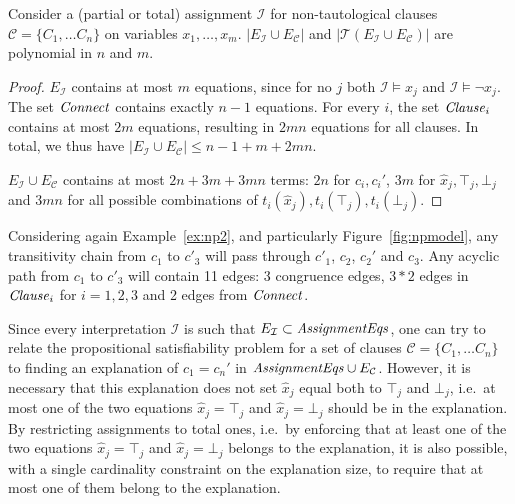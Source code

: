 \documentclass[smallextended]{svjour3}
\newcommand{\Assignment}{{\it AssignmentEqs}}
\newcommand{\Clause}{{\it Clause}}
\newcommand{\Connect}{{\it Connect}}
\begin{document}
\begin{lemma}
Consider a (partial or total) assignment $\mathcal{I}$ for 
non-tautological clauses $\mathcal{C}= \{C_1, \dots C_n\}$ on variables  $x_1,\ldots, x_m$. $|E_{\mathcal{I}} \cup E_\mathcal{C}|$ and
$|\mathcal{T}(E_{\mathcal{I}} \cup E_\mathcal{C})|$ are polynomial in $n$ and
$m$.
\end{lemma}

\begin{proof}
$E_{\mathcal{I}}$ contains at most $m$ equations, since for no $j$ both $\mathcal{I} \models x_j$ and $\mathcal{I} \models \neg x_j$.
The set $\Connect$ contains exactly $n-1$ equations.
For every $i$, the set $\Clause_i$ contains at most $2m$ equations, resulting in $2mn$ equations for all clauses.
In total, we thus have $|E_{\mathcal{I}} \cup E_\mathcal{C}| \leq n-1 + m + 2mn$.

$E_{\mathcal{I}} \cup E_\mathcal{C}$ contains at most $2n + 3m + 3mn$ terms: $2n$ for $c_i,c_i'$, $3m$ for $\hat{x}_j,\top_j,\bot_j$ and $3mn$ for all possible combinations of $t_i(\hat{x}_j),t_i(\top_j),t_i(\bot_j)$.
\end{proof}

\noindent 
Considering again Example~\ref{ex:np2}, and particularly
Figure~\ref{fig:npmodel}, any transitivity chain from $c_1$ to
$c'_3$ will pass through $c'_1$, $c_2$, $c_2'$ and
$c_3$.  Any acyclic path from $c_1$ to $c'_3$ will contain 11
edges: 3 congruence edges, $3*2$ edges in $\Clause_i$ for $i=1,2,3$
and 2 edges from $\Connect$.

Since every interpretation $\mathcal{I}$ is such that $E_{\mathcal{I}} \subset
\Assignment$, one can try to relate the propositional satisfiability
problem for a set of clauses $\mathcal{C}= \{C_1, \dots C_n\}$ to finding an
explanation of $c_1 = c_n'$ in $\Assignment \cup
E_{\mathcal{C}}$.  However, it is necessary that this explanation does not set
$\hat{x}_j$ equal both to $\top_j$ and $\bot_j$, i.e.\ at most one of the two
equations $\hat{x}_j = \top_j$ and $\hat{x}_j = \bot_j$ should be in the
explanation.  By restricting assignments to total ones, i.e.\ by enforcing that
at least one of the two equations $\hat{x}_j = \top_j$ and $\hat{x}_j = \bot_j$
belongs to the explanation, it is also possible, with a single cardinality
constraint on the explanation size, to require that at most one of them 
belong to the explanation.
\end{document}
